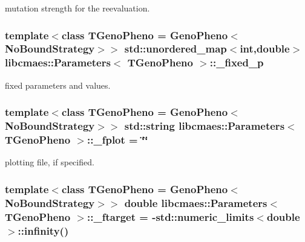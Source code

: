 mutation strength for the reevaluation. \hypertarget{classlibcmaes_1_1Parameters_a83fdae9d4bb9b77c8ad955c6aac75086}{
\subsubsection[{\+\_\+fixed\+\_\+p}]{\setlength{\rightskip}{0pt plus 5cm}template$<$class T\+Geno\+Pheno = Geno\+Pheno$<$\+No\+Bound\+Strategy$>$$>$ std\+::unordered\+\_\+map$<$int,double$>$ {\bf libcmaes\+::\+Parameters}$<$ T\+Geno\+Pheno $>$\+::\+\_\+fixed\+\_\+p\hspace{0.3cm}{\ttfamily [protected]}}}\label{classlibcmaes_1_1Parameters_a83fdae9d4bb9b77c8ad955c6aac75086}
fixed parameters and values. \hypertarget{classlibcmaes_1_1Parameters_aa49511ea00199348ea94f1aa53fe5bc1}{
\subsubsection[{\+\_\+fplot}]{\setlength{\rightskip}{0pt plus 5cm}template$<$class T\+Geno\+Pheno = Geno\+Pheno$<$\+No\+Bound\+Strategy$>$$>$ std\+::string {\bf libcmaes\+::\+Parameters}$<$ T\+Geno\+Pheno $>$\+::\+\_\+fplot = \char`\"{}\char`\"{}\hspace{0.3cm}{\ttfamily [protected]}}}\label{classlibcmaes_1_1Parameters_aa49511ea00199348ea94f1aa53fe5bc1}
plotting file, if specified. \hypertarget{classlibcmaes_1_1Parameters_a837dbcfba351a043441076a11666f92c}{
\subsubsection[{\+\_\+ftarget}]{\setlength{\rightskip}{0pt plus 5cm}template$<$class T\+Geno\+Pheno = Geno\+Pheno$<$\+No\+Bound\+Strategy$>$$>$ double {\bf libcmaes\+::\+Parameters}$<$ T\+Geno\+Pheno $>$\+::\+\_\+ftarget = -\/std\+::numeric\+\_\+limits$<$double$>$\+::infinity()\hspace{0.3cm}{\ttfamily [protected]}}}\label{classlibcmaes_1_1Parameters_a837dbcfba351a043441076a11666f92c}
